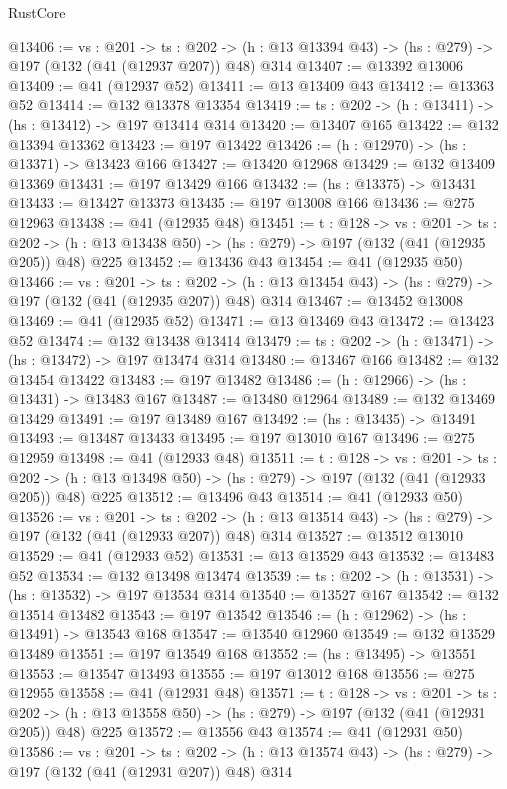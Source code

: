 \begin{lexlean}{RustCore}
\begin{coremodule}
@13406 := {vs : @201} ->
  {ts : @202} -> (h : @13 @13394 @43) -> (hs : @279) -> @197 (@132 (@41 (@12937 @207)) @48) @314
@13407 := @13392 @13006
@13409 := @41 (@12937 @52)
@13411 := @13 @13409 @43
@13412 := @13363 @52
@13414 := @132 @13378 @13354
@13419 := {ts : @202} -> (h : @13411) -> (hs : @13412) -> @197 @13414 @314
@13420 := @13407 @165
@13422 := @132 @13394 @13362
@13423 := @197 @13422
@13426 := (h : @12970) -> (hs : @13371) -> @13423 @166
@13427 := @13420 @12968
@13429 := @132 @13409 @13369
@13431 := @197 @13429 @166
@13432 := (hs : @13375) -> @13431
@13433 := @13427 @13373
@13435 := @197 @13008 @166
@13436 := @275 @12963
@13438 := @41 (@12935 @48)
@13451 := {t : @128} ->
  {vs : @201} ->
  {ts : @202} -> (h : @13 @13438 @50) -> (hs : @279) -> @197 (@132 (@41 (@12935 @205)) @48) @225
@13452 := @13436 @43
@13454 := @41 (@12935 @50)
@13466 := {vs : @201} ->
  {ts : @202} -> (h : @13 @13454 @43) -> (hs : @279) -> @197 (@132 (@41 (@12935 @207)) @48) @314
@13467 := @13452 @13008
@13469 := @41 (@12935 @52)
@13471 := @13 @13469 @43
@13472 := @13423 @52
@13474 := @132 @13438 @13414
@13479 := {ts : @202} -> (h : @13471) -> (hs : @13472) -> @197 @13474 @314
@13480 := @13467 @166
@13482 := @132 @13454 @13422
@13483 := @197 @13482
@13486 := (h : @12966) -> (hs : @13431) -> @13483 @167
@13487 := @13480 @12964
@13489 := @132 @13469 @13429
@13491 := @197 @13489 @167
@13492 := (hs : @13435) -> @13491
@13493 := @13487 @13433
@13495 := @197 @13010 @167
@13496 := @275 @12959
@13498 := @41 (@12933 @48)
@13511 := {t : @128} ->
  {vs : @201} ->
  {ts : @202} -> (h : @13 @13498 @50) -> (hs : @279) -> @197 (@132 (@41 (@12933 @205)) @48) @225
@13512 := @13496 @43
@13514 := @41 (@12933 @50)
@13526 := {vs : @201} ->
  {ts : @202} -> (h : @13 @13514 @43) -> (hs : @279) -> @197 (@132 (@41 (@12933 @207)) @48) @314
@13527 := @13512 @13010
@13529 := @41 (@12933 @52)
@13531 := @13 @13529 @43
@13532 := @13483 @52
@13534 := @132 @13498 @13474
@13539 := {ts : @202} -> (h : @13531) -> (hs : @13532) -> @197 @13534 @314
@13540 := @13527 @167
@13542 := @132 @13514 @13482
@13543 := @197 @13542
@13546 := (h : @12962) -> (hs : @13491) -> @13543 @168
@13547 := @13540 @12960
@13549 := @132 @13529 @13489
@13551 := @197 @13549 @168
@13552 := (hs : @13495) -> @13551
@13553 := @13547 @13493
@13555 := @197 @13012 @168
@13556 := @275 @12955
@13558 := @41 (@12931 @48)
@13571 := {t : @128} ->
  {vs : @201} ->
  {ts : @202} -> (h : @13 @13558 @50) -> (hs : @279) -> @197 (@132 (@41 (@12931 @205)) @48) @225
@13572 := @13556 @43
@13574 := @41 (@12931 @50)
@13586 := {vs : @201} ->
  {ts : @202} -> (h : @13 @13574 @43) -> (hs : @279) -> @197 (@132 (@41 (@12931 @207)) @48) @314

\end{coremodule}
\end{lexlean}

